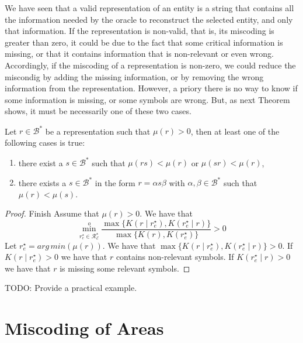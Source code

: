We have seen that a valid representation of an entity is a string that contains all the information needed by the oracle to reconstruct the selected entity, and only that information. If the representation is non-valid, that is, its miscoding is greater than zero, it could be due to the fact that some critical information is missing, or that it contains information that is non-relevant or even wrong. Accordingly, if the miscoding of a representation is non-zero, we could reduce the miscondig by adding the missing information, or by removing the wrong information from the representation. However, a priory there is no way to know if some information is missing, or some symbols are wrong. But, as next Theorem shows, it must be necessarily one of these two cases. 

\begin{theorem}
\label{th:reduce_miscoding}
Let $r \in \mathcal{B}^\ast$ be a representation such that $\mu(r) >0$, then at least one of the following cases is true:
\begin{enumerate}[label=(\roman*)]
\item there exist a $s \in \mathcal{B}^\ast$ such that $\mu(rs) < \mu(r)$ or $\mu(sr) < \mu(r)$,
\item there exists a $s \in \mathcal{B}^\ast$ in the form $r = \alpha s \beta$ with $\alpha, \beta \in \mathcal{B}^\ast$ such that $\mu(r) < \mu(s)$.
\end{enumerate}
\end{theorem}
\begin{proof}
{\color{red} Finish}
Assume that $\mu(r) >0$. We have that
\[
\overset{o}{ \underset{ r^\star_e \in \mathcal{R}^\star_\mathcal{E} } \min} \frac{ \max\{ K \left( r \mid r^\star_e \right), K \left( r^\star_e \mid r \right) \} } { \max\{ K \left( r \right), K \left( r^\star_e \right) \} } > 0
\]
Let $r^\star_e = arg\,min \left( \mu(r) \right)$. We have that $\max\{ K \left( r \mid r^\star_e \right), K \left( r^\star_e \mid r \right) \} > 0$. If $K \left( r \mid r^\star_e \right) > 0$ we have that $r$ contains non-relevant symbols. If $K \left( r^\star_e \mid r \right) > 0$ we have that $r$ is missing some relevant symbols.
\end{proof}

{\color{red} TODO: Provide a practical example.}

%
%
\section{Miscoding of Areas}
\label{sec:miscoding_areas}

